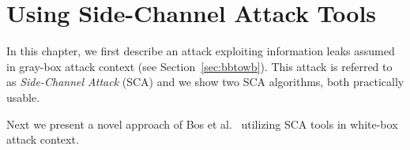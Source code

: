 \chapter{Using Side-Channel Attack Tools}
\label{chap:attack}

In this chapter, we first describe an attack exploiting information leaks assumed in gray-box attack context (see Section~\ref{sec:bbtowb}). This attack is referred to as {\em Side-Channel Attack} (SCA) and we show two SCA algorithms, both practically usable.

Next we present a novel approach of Bos et al.\ \cite{bos2015differential} utilizing SCA tools in white-box attack context.




